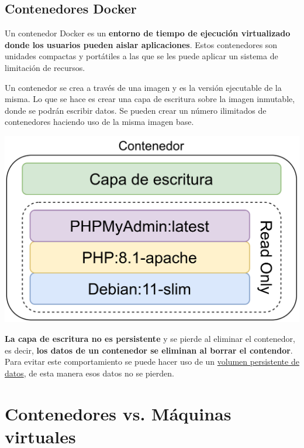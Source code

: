 \subsection{Contenedores Docker}
Un contenedor Docker es un \textbf{entorno de tiempo de ejecución virtualizado donde los usuarios pueden aislar aplicaciones}. Estos contenedores son unidades compactas y portátiles a las que se les puede aplicar un sistema de limitación de recursos.


Un contenedor se crea a través de una imagen y es la versión ejecutable de la misma. Lo que se hace es crear una capa de escritura sobre la imagen inmutable, donde se podrán escribir datos. Se pueden crear un número ilimitados de contenedores haciendo uso de la misma imagen base.

\vspace{-20pt}
\begin{center}
    \includegraphics[width=0.6\linewidth]{img/docker/contenedor.png}
\end{center}
\vspace{-15pt}

\textbf{La capa de escritura no es persistente} y se pierde al eliminar el contenedor, es decir, \textbf{los datos de un contenedor se eliminan al borrar el contendor}. Para evitar este comportamiento se puede hacer uso de un \hyperlink{volumen_persistente_datos}{volumen persistente de datos}, de esta manera esos datos no se pierden.



\section{Contenedores vs. Máquinas virtuales}

